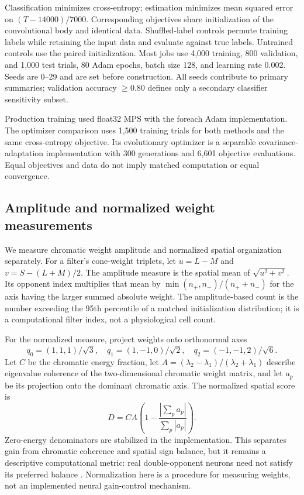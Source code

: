 \documentclass[authoryear,preprint,review,12pt]{elsarticle}
\begin{document}
Classification minimizes cross-entropy; estimation minimizes mean squared error on $(T-14000)/7000$. Corresponding objectives share initialization of the convolutional body and identical data. Shuffled-label controls permute training labels while retaining the input data and evaluate against true labels. Untrained controls use the paired initialization. Most jobs use 4,000 training, 800 validation, and 1,000 test trials, 80 Adam epochs, batch size 128, and learning rate 0.002. Seeds are 0--29 and are set before construction. All seeds contribute to primary summaries; validation accuracy $\geq0.80$ defines only a secondary classifier sensitivity subset.

Production training used float32 MPS with the foreach Adam implementation. The optimizer comparison uses 1,500 training trials for both methods and the same cross-entropy objective. Its evolutionary optimizer is a separable covariance-adaptation implementation with 300 generations and 6,601 objective evaluations. Equal objectives and data do not imply matched computation or equal convergence.

\subsection{Amplitude and normalized weight measurements}\label{sec:metrics}
We measure chromatic weight amplitude and normalized spatial organization separately. For a filter's cone-weight triplets, let $u=L-M$ and $v=S-(L+M)/2$. The amplitude measure is the spatial mean of $\sqrt{u^2+v^2}$. Its opponent index multiplies that mean by $\min(n_+,n_-)/(n_++n_-)$ for the axis having the larger summed absolute weight. The amplitude-based count is the number exceeding the 95th percentile of a matched initialization distribution; it is a computational filter index, not a physiological cell count.

For the normalized measure, project weights onto orthonormal axes
\begin{equation}
q_0=(1,1,1)/\sqrt3,\quad q_1=(1,-1,0)/\sqrt2,\quad q_2=(-1,-1,2)/\sqrt6.
\end{equation}
Let $C$ be the chromatic energy fraction, let $A=(\lambda_2-\lambda_1)/(\lambda_2+\lambda_1)$ describe eigenvalue coherence of the two-dimensional chromatic weight matrix, and let $a_p$ be its projection onto the dominant chromatic axis. The normalized spatial score is
\begin{equation}
D=C A\left(1-\frac{|\sum_p a_p|}{\sum_p |a_p|}\right).
\end{equation}
Zero-energy denominators are stabilized in the implementation. This separates gain from chromatic coherence and spatial sign balance, but it remains a descriptive computational metric: real double-opponent neurons need not satisfy its preferred balance \citep{de2021spatial}. Normalization here is a procedure for measuring weights, not an implemented neural gain-control mechanism.
\end{document}
